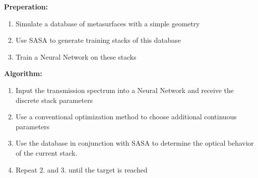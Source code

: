 \textbf{Preperation:}
\begin{enumerate}
    \item Simulate a database of metasurfaces with a simple geometry

    \item Use SASA to generate training stacks of this database

    \item Train a Neural Network on these stacks
\end{enumerate}

\textbf{Algorithm:}
\begin{enumerate}
    \item Input the transmission spectrum into a Neural Network and receive the discrete stack parameters

    \item Use a conventional optimization method to choose additional continuous parameters

    \item Use the database in conjunction with SASA to determine the optical behavior of the current stack.

    \item Repeat 2. and 3. until the target is reached
\end{enumerate}
